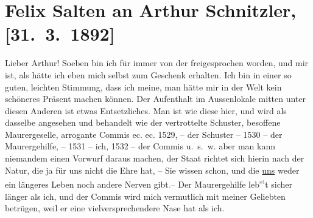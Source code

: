 

\renewcommand{\erwaehntePersonen}{Personen:  ?? [Liebhaberin von Felix Salten, Ende März 1892]}
\renewcommand{\erwaehnteOrte}{Orte: Café Kremser, Kettenbrücke, Wien}
\renewcommand{\erwaehnteWerke}{}
\section[Felix Salten an Arthur Schnitzler, {[}31. 3. 1892{]}]{Felix Salten an Arthur Schnitzler, {[}31. 3. 1892{]}}
\nopagebreak{}
\rehead{ }\normalsize\beginnumbering{}
\toendnotes[C]{\smallbreak\pagebreak[2]}
\toendnotes[C]{\smallbreak}
\pstart
           \noindent{}{\pb}Lieber Arthur! Soeben bin ich für immer von der
                  \label{K_L03108-1v}\label{K_L03108-1h}
               freigesprochen worden, und mir ist, als hätte ich eben mich selbst zum Geschenk
               erhalten. Ich bin in einer so guten, leichten Stimmung, dass ich meine, man hätte mir
               in der Welt kein schöneres Präsent machen können. Der Aufenthalt {\pb}im Aussenlokale mitten
               unter diesen Anderen ist etwas Entsetzliches. Man ist wie diese hier, und wird als
               dasselbe angesehen und behandelt wie der vertrottelte Schuster, besoffene
               Maurergeselle, arrogante Commis ec. ec. 1529, – der Schuster – 1530 – der
               Maurergehilfe, – 1531 – ich, 1532 – der Commis u. s. w. aber man kann niemandem einen
               Vorwurf daraus machen, der Staat richtet {\pb}sich hierin nach der
               Natur, die ja für uns nicht die Ehre hat, – Sie wissen schon, und die \uline{uns} weder ein längeres Leben noch andere Nerven
                  gibt\textcolor{gray}{.–} Der Maurergehilfe leb\substVorne{}\textsuperscript{\textcolor{gray}{st}}\substDazwischen{}t\substHinten{} sicher länger als ich, und der Commis wird mich vermutlich mit meiner
               Geliebten betrügen, weil er eine vielversprechendere Nase hat als ich.\pend
           
